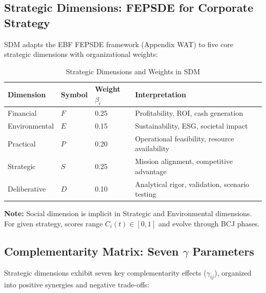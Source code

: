 \subsection{Strategic Dimensions: FEPSDE for Corporate Strategy}
\label{subsec:sdm-dimensions}

SDM adapts the EBF FEPSDE framework (Appendix WAT) to five core strategic dimensions with organizational weights:

\begin{table}[htbp]
\centering
\caption{Strategic Dimensions and Weights in SDM}
\label{tab:sdm-dimensions}
\renewcommand{\arraystretch}{1.4}
\begin{tabular}{@{}lllp{5cm}@{}}
\toprule
\textbf{Dimension} & \textbf{Symbol} & \textbf{Weight $\beta_i$} & \textbf{Interpretation} \\
\midrule
Financial & $F$ & 0.25 & Profitability, ROI, cash generation \\
Environmental & $E$ & 0.15 & Sustainability, ESG, societal impact \\
Practical & $P$ & 0.20 & Operational feasibility, resource availability \\
Strategic & $S$ & 0.25 & Mission alignment, competitive advantage \\
Deliberative & $D$ & 0.10 & Analytical rigor, validation, scenario testing \\
\bottomrule
\end{tabular}
\end{table}

\textbf{Note:} Social dimension is implicit in Strategic and Environmental dimensions. For given strategy, scores range $C_i(t) \in [0,1]$ and evolve through BCJ phases.

\subsection{Complementarity Matrix: Seven $\gamma$ Parameters}
\label{subsec:sdm-gamma}

Strategic dimensions exhibit seven key complementarity effects ($\gamma_{ij}$), organized into positive synergies and negative trade-offs:

